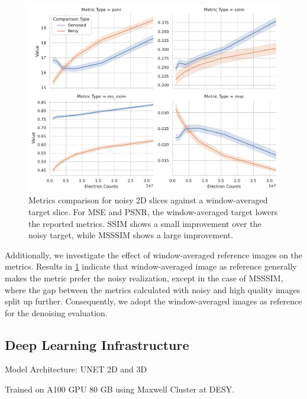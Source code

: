 \begin{figure}
    \centering
    \includegraphics[width=0.7\linewidth]{images/metrics_comparison_denoised_noisy_averaged.pdf}
    \caption{Metrics comparison for noisy 2D slices against a window-averaged target slice. For \gls{MSE} and \gls{PSNR}, the window-averaged target lowers the reported metrics. \Gls{SSIM} shows a small improvement over the noisy target, while \gls{MSSSIM} shows a large improvement.}
    \label{fig:metrics-comparison-averaged-target}
\end{figure}

Additionally, we investigate the effect of window-averaged reference images on the metrics. Results in \cref{fig:metrics-comparison-averaged-target} indicate that window-averaged image as reference generally makes the metric prefer the noisy realization, except in the case of \gls{MSSSIM}, where the gap between the metrics calculated with noisy and high quality images split up further. Consequently, we adopt the window-averaged images as reference for the denoising evaluation.


\subsection{Deep Learning Infrastructure}
Model Architecture: UNET 2D and 3D

Trained on A100 GPU 80 GB using Maxwell Cluster at DESY. 

